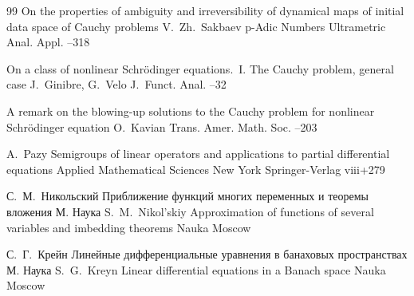 \begin{thebibliography}{99}
\paper On the properties of ambiguity and irreversibility of dynamical maps of initial data space of Cauchy problems
\by V.~Zh.~Sakbaev
\jour p-Adic Numbers Ultrametric Anal. Appl.
--318



\paper On a class of nonlinear Schr\"odinger equations.~I. The Cauchy problem, general case
\by J.~Ginibre, G.~Velo
\jour J.~Funct. Anal.
--32



\paper A remark on the blowing-up solutions to the Cauchy problem for nonlinear Schr\"odinger equation
\by O.~Kavian
\jour Trans. Amer. Math. Soc. 
--203

\by A.~Pazy
\paper Semigroups of linear operators and applications to partial differential equations
\serial Applied Mathematical Sciences
\publaddr New York
\publ Springer-Verlag
\totalpages viii+279


\by С.~М.~Никольский
\book Приближение функций многих переменных и теоремы вложения
\publaddr М.
\publ Наука
\misctransl
\by S.~M.~Nikol'skiy
\book Approximation of functions of several variables and imbedding theorems
\publ Nauka
\publaddr Moscow


\by С.~Г.~Крейн
\book Линейные дифференциальные уравнения в банаховых пространствах
\publaddr М.
\publ Наука
\misctransl 
\by S.~G.~Kreyn
\book Linear differential equations in a Banach space
\publ Nauka
\publaddr Moscow 

\end{thebibliography}


\noindent
\hskip6.5cm \thedate \par\noindent
\hskip6.5cm\therevdate
%
%

\makeengtitle
%


\newpage
%
%
